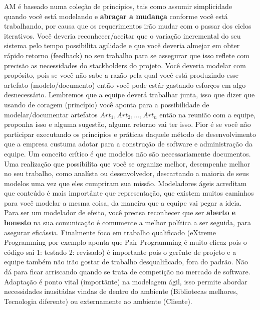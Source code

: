 \documentclass[conference]{IEEEtran}
\begin{document}
AM é baseado numa coleção de princípios, tais como assumir simplicidade quando você está modelando e {\bfseries abraçar a mudança} conforme você está trabalhando, por causa que os requerimentos irão mudar com o passar dos ciclos iterativos. Você deveria reconhecer/aceitar que o variação incremental do seu sistema pelo tempo possibilita agilidade e que você deveria almejar em obter rápido retorno (feedback) no seu trabalho para se assegurar que isso reflete com precisão as necessidades do stackholders do projeto. Você deveria modelar com propósito, pois se você não sabe a razão pela qual você está produzindo esse artefato (modelo/documento) então você pode estár gastando esforços em algo desnecessário. Lembremos que a equipe deverá trabalhar junta, isso que dizer que usando de coragem (princípio) você aponta para a possibilidade de modelar/documentar artefatos $Art_1, Art_2, ...,Art_n$ então na reunião com a equipe, proponha isso e alguma sugestão, alguma retorno vai ter isso. Pior é se você não participar executando os princípios e práticas daquele método de desenvolvimento que a empresa custuma adotar para a construção de software e administração da equipe. Um conceito crítico é que modelos não são necessariamente documentos. Uma realização que possibilita que você se organize melhor, desempenhe melhor no seu trabalho, como analísta ou desenvolvedor, descartando a maioria de seus modelos uma vez que eles cumpriram sua missão. Modeladores ágeis acreditam que conteúdo é mais importânte que representação, que existem muitos caminhos para você modelar a mesma coisa, da maneira que a equipe vai pegar a ideia. Para ser um modelador de efeito, você precisa reconhecer que ser {\bfseries aberto e honesto} na sua comunicação é comumente a melhor política a ser seguida, para asegurar eficássia. Finalmente foco em trabalho qualificado (eXtreme Programming por exemplo aponta que Pair Programming é muito eficaz pois o código sai 1: testado 2: revisado) é importante pois o gerênte de projeto e a equipe também não irão gostar de trabalho desqualificado, fora do padrão. Não dá para ficar arriscando quando se trata de competição no mercado de software. Adaptação é ponto vital (importânte) na modelagem ágil, isso permite abordar necessidades inusitádas vindas de dentro do ambiente (Bibliotecas melhores, Tecnologia diferente) ou externamente ao ambiente (Cliente).
\end{document}
